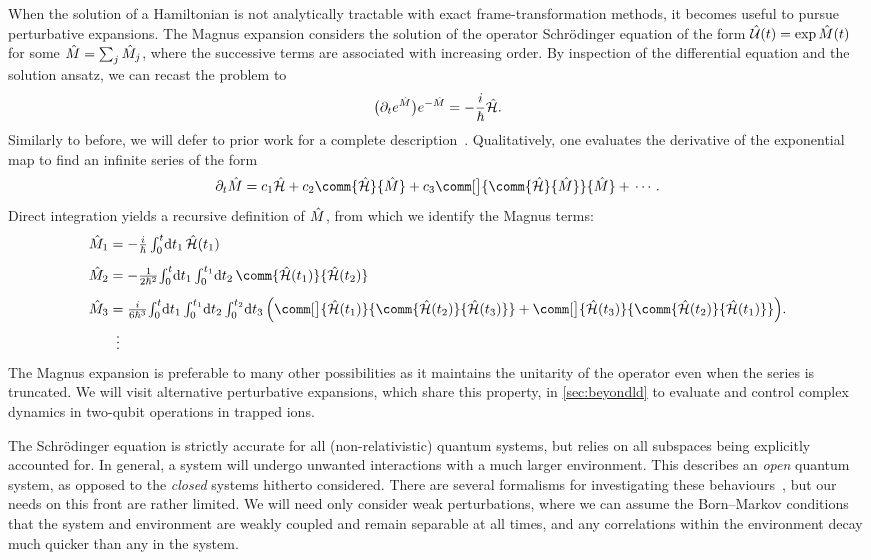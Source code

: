 When the solution of a Hamiltonian is not analytically tractable with exact frame-transformation methods, it becomes useful to pursue perturbative expansions.
The Magnus expansion considers the solution of the operator Schr\"odinger equation of the form $\hat{\mathcal U}(t) = \exp\hat{M}(t)$ for some $\hat{M} = \sum_j \hat{M}_j$, where the successive terms are associated with increasing order.
By inspection of the differential equation and the solution ansatz, we can recast the problem to
\begin{equation}
\bigl(\partial_t e^{\hat{M}}\bigr)e^{-\hat{M}} = -\frac i\hbar\hat{\mathcal H}.
\end{equation}
Similarly to before, we will defer to prior work for a complete description~\cite{Magnus1954}.
Qualitatively, one evaluates the derivative of the exponential map to find an infinite series of the form
\begin{equation}
\partial_t \op M = c_1 \H + c_2 \comm{\H}{\op M} + c_3 \comm[\big]{\comm{\H}{\op M}}{\op M} +\,\dotsb.
\end{equation}
Direct integration yields a recursive definition of $\hat{M}$, from which we identify the Magnus terms:
\begin{align}
    \op M_1 &= \textstyle -\frac i\hbar\int_0^t\!\mathrm dt_1\,\H(t_1) \notag\\[0.5em]
    \op M_2 &= \textstyle -\frac1{2\hbar^2}\!\int_0^t\!\mathrm dt_1\int_0^{t_1}\!\mathrm dt_2\, \comm{\H(t_1)}{\H(t_2)} \label{eq:qi-magnus}\\[0.5em]
    \op M_3 &= \textstyle 
        \frac i{6\hbar^3}
        \!\int_0^t\!\mathrm dt_1\int_0^{t_1}\!\mathrm dt_2\int_0^{t_2}\!\mathrm dt_3\,
        \Bigl(\comm[\big]{\H(t_1)}{\comm{\H(t_2)}{\H(t_3)}}
        + \comm[\big]{\H(t_3)}{\comm{\H(t_2)}{\H(t_1)}} \Bigr).\notag\\
&\vdotswithin{\mathrel{=}}\notag
\end{align}
The Magnus expansion is preferable to many other possibilities as it maintains the unitarity of the operator even when the series is truncated.
We will visit alternative perturbative expansions, which share this property, in \cref{sec:beyondld} to evaluate and control complex dynamics in two-qubit operations in trapped ions.

The Schr\"odinger equation is strictly accurate for all (non-relativistic) quantum systems, but relies on all subspaces being explicitly accounted for.
In general, a system will undergo unwanted interactions with a much larger environment.
This describes an \emph{open} quantum system, as opposed to the \emph{closed} systems hitherto considered.
There are several formalisms for investigating these behaviours~\cite{Breuer2002}, but our needs on this front are rather limited.
We will need only consider weak perturbations, where we can assume the Born--Markov conditions that the system and environment are weakly coupled and remain separable at all times, and any correlations within the environment decay much quicker than any in the system.

